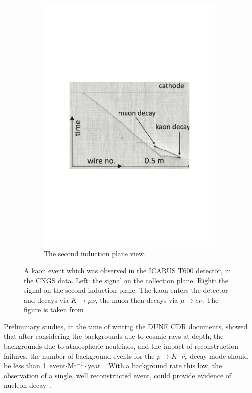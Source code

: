 \begin{figure}
\begin{subfigure}{0.42\textwidth}
    \includegraphics[width=\textwidth]{ICARUSKaon_Ind}
    \caption{The second induction plane view.}
  \end{subfigure}
  \caption[A kaon event which was observed in the ICARUS T600 detector, in the CNGS data]
          {A kaon event which was observed in the ICARUS T600 detector, in the CNGS data. Left: the signal on the collection plane. Right: the signal on the second induction plane. The kaon enters the detector and decays via $K \rightarrow \mu \nu$, the muon then decays via $\mu \rightarrow e \nu$. The figure is taken from~\citep{PMTrack}.}
  \label{fig:ICARUSKaon}
\end{figure}

Preliminary studies, at the time of writing the DUNE CDR documents, showed that after considering the backgrounds due to cosmic rays at depth, the backgrounds due to atmospheric neutrinos, and the impact of reconstruction failures, the number of background events for the $p \rightarrow K^{+} \overline{\nu_{e}}$ decay mode should be less than 1~event$\cdot$Mt$^{-1}\cdot$year~\citep{Klinger:2015kva, Adams:2013qkq, LBNE8836}. With a background rate this low, the observation of a single, well reconstructed event, could provide evidence of nucleon decay~\citep{DUNECDR_V2}. 

